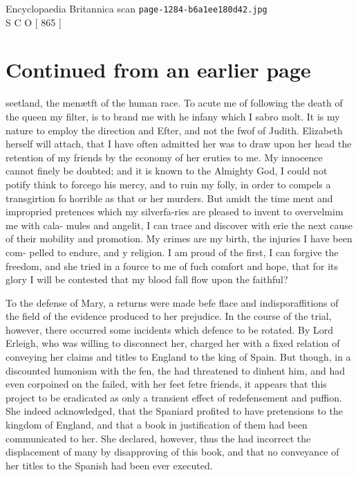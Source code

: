 \documentclass{article}
\begin{document}
\begin{center}
{\Large Encyclopaedia Britannica scan \texttt{page-1284-b6a1ee180d42.jpg}}\\[0.5em]
S C O [ 865 ]
\end{center}
\section*{Continued from an earlier page}
seetland, the menætft of the human race. To acute me of following the death of the queen my filter, is to brand me with he infany which I sabro molt. It is my nature to employ the direction and Efter, and not the fwof of Judith. Elizabeth herself will attach, that I have often admitted her was to draw upon her head the retention of my friends by the economy of her eruties to me. My innocence cannot finely be doubted; and it is known to the Almighty God, I could not potify think to forcego his mercy, and to ruin my folly, in order to compels a transgirtion fo horrible as that or her murders. But amidt the time ment and impropried pretences which my silverfa-ries are pleased to invent to overvelmim me with cala- mules and angelit, I can trace and discover with erie the next cause of their mobility and promotion. My crimes are my birth, the injuries I have been com- pelled to endure, and y religion. I am proud of the first, I can forgive the freedom, and she tried in a fource to me of fuch comfort and hope, that for its glory I will be contested that my blood fall flow upon the faithful?

To the defense of Mary, a returns were made befe flace and indisporaffitions of the field of the evidence produced to her prejudice. In the course of the trial, however, there occurred some incidents which defence to be rotated. By Lord Erleigh, who was willing to disconnect her, charged her with a fixed relation of conveying her claims and titles to England to the king of Spain. But though, in a discounted humonism with the fen, the had threatened to dinhent him, and had even corpoined on the failed, with her feet fetre friends, it appears that this project to be eradicated as only a transient effect of redefensement and puffion. She indeed acknowledged, that the Spaniard profited to have pretensions to the kingdom of England, and that a book in justification of them had been communicated to her. She declared, however, thus the had incorrect the displacement of many by disapproving of this book, and that no conveyance of her titles to the Spanish had been ever executed.
\end{document}
